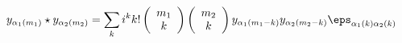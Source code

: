 \begin{equation}
y_{\alpha_1(m_1)}\star y_{\alpha_2(m_2)}=
\sum_k i^k k!\left(\begin{array}{c}m_1\\k\end{array}\right)
\left(\begin{array}{c}m_2\\k\end{array}\right)
y_{\alpha_1(m_1-k)} y_{\alpha_2(m_2-k)}\eps_{\alpha_1(k)\alpha_2(k)}
\end{equation}


